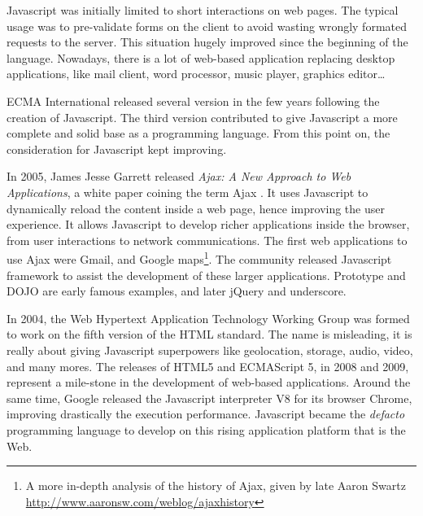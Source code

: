 Javascript was initially limited to short interactions on web pages.
The typical usage was to pre-validate forms on the client to avoid wasting wrongly formated requests to the server.
This situation hugely improved since the beginning of the language.
Nowadays, there is a lot of web-based application replacing desktop applications, like mail client, word processor, music player, graphics editor…

ECMA International released several version in the few years following the creation of Javascript.
The third version contributed to give Javascript a more complete and solid base as a programming language.
From this point on, the consideration for Javascript kept improving.

In 2005, James Jesse Garrett released \textit{Ajax: A New Approach to Web Applications}, a white paper coining the term Ajax \cite{Garrett2005}.
It uses Javascript to dynamically  reload the content inside a web page, hence improving the user experience.
It allows Javascript to develop richer applications inside the browser, from user interactions to network communications.
The first web applications to use Ajax were Gmail, and Google maps\footnote{A more in-depth analysis of the history of Ajax, given by late Aaron Swartz \url{http://www.aaronsw.com/weblog/ajaxhistory}}.
The community released Javascript framework to assist the development of these larger applications.
Prototype and DOJO are early famous examples, and later jQuery and underscore.


In 2004, the Web Hypertext Application Technology Working Group was formed to work on the fifth version of the HTML standard.
The name is misleading, it is really about giving Javascript superpowers like geolocation, storage, audio, video, and many mores.
The releases of HTML5 and ECMAScript 5, in 2008 and 2009, represent a mile-stone in the development of web-based applications.
Around the same time, Google released the Javascript interpreter V8 for its browser Chrome, improving drastically the execution performance.
Javascript became the \textit{defacto} programming language to develop on this rising application platform that is the Web.

